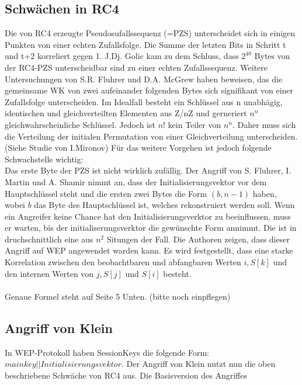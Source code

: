 \documentclass[10pt,a4paper]{article}
\begin{document}
\subsection{Schwächen in RC4}
Die von RC4 erzeugte Pseudosufallssequenz (=PZS) unterscheidet sich in einigen Punkten von einer echten Zufallsfolge. Die Summe der letzten Bits in Schritt t und t+2 korreliert gegen 1.
J.Dj. Golic kam zu dem Schluss, dass $2^40$ Bytes von der RC4-PZS unterscheidbar sind zu einer echten Zufallssequenz.
Weitere Untersuchungen von S.R. Fluhrer und D.A. McGrew haben beweisen, das die gemeinsame WK von zwei aufeinander folgenden Bytes sich signifikant von einer Zufallsfolge unterscheiden. Im Idealfall besteht ein Schlüssel aus n unabhägig, identischen und gleichverteilten Elementen aus Z/nZ und gerneriert $n^n$ gleichwahrscheinliche Schlüssel. Jedoch ist $n!$ kein Teiler von $n^n$. Daher muss sich die Verteilung der initialen Permutation von einer Gleichverteilung unterscheiden. (Siehe Studie von I.Mironov)
Für das weitere Vorgehen ist jedoch folgende Schwachstelle wichtig:\\
Das erste Byte der PZS ist nicht wirklich zufällig. Der Angriff von S. Fluhrer, I. Martin und A. Shamir nimmt an, dass der Initialisierungsvektor vor dem Hauptschlüssel steht und die ersten zwei Bytes die Form $(b,n-1)$ haben, wobei $b$ das Byte des Hauptschlüssel ist, welches rekonstruiert werden soll. Wenn ein Angreifer keine Chance hat den Initialisierungsverktor zu beeinflussen, muss er warten, bis der initialiserungsverktor die gewünschte Form annimmt. Die ist in druchschnittlich eine aus $n^2$ Situngen der Fall. Die Authoren zeigen, dass dieser Angriff auf WEP angewendet warden kann.
Es wird festgestellt, dass eine starke Korrelation zwischen den beobachtbaren und abfangbaren Werten $i, S[k]$ und den internen Werten von $j, S[j]$ und $S[i]$ besteht.
\\\\
Genaue Formel steht auf Seite 5 Unten. (bitte noch einpflegen)

\subsection{Angriff von Klein}

In WEP-Protokoll haben SessionKeys die folgende Form: $main key || Initialisierungsvektor$. Der Angriff von Klein nutzt nun die oben beschriebene Schwäche von RC4 aus.
Die Basisversion des Angriffes
\end{document}
